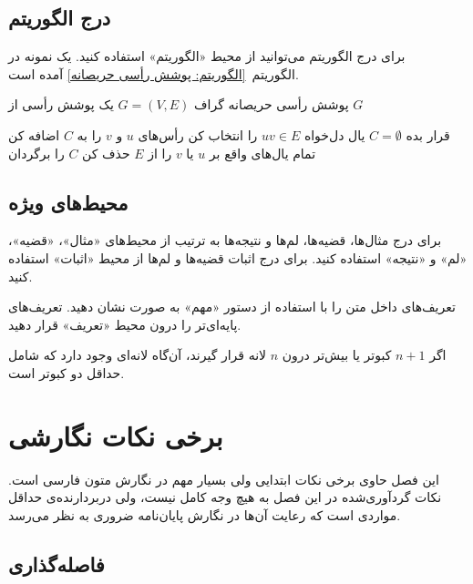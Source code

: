 \subsection{درج الگوریتم}

برای درج الگوریتم می‌توانید از محیط «الگوریتم» استفاده کنید.
یک نمونه در الگوریتم~\ref{الگوریتم: پوشش رأسی حریصانه} آمده است.

\begin{الگوریتم}{پوشش رأسی حریصانه}
 گراف $G=(V, E)$
 یک پوشش رأسی از $G$

 قرار بده $C = \emptyset$  %
 یال دل‌‌خواه $uv \in E$ را انتخاب کن
 رأس‌های $u$ و $v$ را به $C$ اضافه کن
 تمام یال‌های واقع بر $u$ یا $v$ را از $E$ حذف کن
 $C$ را برگردان
\end{الگوریتم}


\subsection{محیط‌های ویژه}

برای درج مثال‌ها، قضیه‌ها، لم‌ها و نتیجه‌ها به ترتیب از محیط‌های
«مثال»، «قضیه»، «لم» و «نتیجه» استفاده کنید.
برای درج اثبات قضیه‌ها و لم‌ها  از محیط «اثبات» استفاده کنید.

تعریف‌های داخل متن را با استفاده از دستور «مهم» به صورت  نشان دهید.
تعریف‌های پایه‌ای‌تر را درون محیط «تعریف» قرار دهید.

\begin{تعریف}
اگر $n+1$ کبوتر یا بیش‌تر درون  $n$ لانه قرار گیرند، آن‌گاه لانه‌ای 
وجود دارد که شامل حداقل دو کبوتر است.
\end{تعریف}




\section{برخی نکات نگارشی}

این فصل حاوی برخی نکات ابتدایی ولی بسیار مهم در نگارش متون فارسی است. 
نکات گردآوری‌شده در این فصل به‌ هیچ‌ وجه کامل نیست، 
ولی دربردارنده‌ی حداقل مواردی است که رعایت آن‌ها در نگارش پایان‌نامه ضروری به نظر می‌رسد.

\subsection{فاصله‌گذاری}

